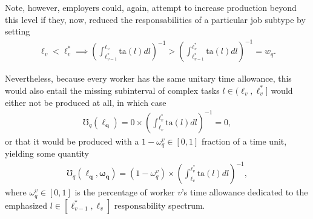 \documentclass[hidelinks, nonatbib]{elsarticle}
\begin{document}
\begin{enumerate}
    Note, however, employers could, again, attempt to increase production beyond this level if they, now, reduced the responsabilities of a particular job subtype by setting
    \begin{align}
    \ell_v < \ell_{v}^{*}
    \implies
        \left(
            \int_{
                \ell_{v-1}^{*}
            }^{
                \ell_{v}
            }
            \text{ta}(l)dl
        \right) ^ {-1}
        >
        \left(
            \int_{
                \ell_{v-1}^{*}
            }^{
                \ell_{v}^{*}
            }
            \text{ta}(l)dl
        \right) ^ {-1}
        =
        w_q
        .
    \end{align}
    
    Nevertheless, because every worker has the same unitary time allowance, this would also entail the missing subinterval of complex tasks $l \in (\ell_{v}, \ell_{v}^{*}]$ would either not be produced at all, in which case
    \begin{align}
        \mho_{q}(\boldsymbol{\ell_{q}})
        =
        0
        \times
        \left(
            \int_{
                \ell_{v}
            }^{
                \ell_{v}^{*}
            }
            \text{ta}(l)dl
        \right) ^ {-1}
        =
        0
        ,
    \end{align}
    or that it would be produced with a $1 - \omega_{q}^{v} \in [0,1]$ fraction of a time unit, yielding some quantity
    \begin{align}
        \mho_{q}(
            \boldsymbol{\ell_{q}}
            ,\boldsymbol{\omega_{q}}
        )
        =
        (1 - \omega_{q}^{v})
        \times
        \left(
            \int_{
                \ell_{v}
            }^{
                \ell_{v}^{*}
            }
            \text{ta}(l)dl
        \right) ^ {-1}
        ,
    \end{align}
    where $\omega_{q}^{v} \in [0,1]$ is the percentage of worker $v$'s time allowance dedicated to the emphasized $l \in [\ell_{v-1}^{*}, \ell_{v}]$ responsability spectrum.


\end{enumerate}
\end{document}
